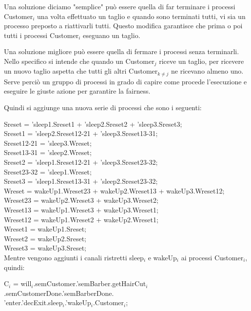 Una soluzione diciamo "semplice" può essere quella di far terminare i processi \textsf{Customer$_{i}$} una volta effettuato un taglio e quando sono terminati tutti, vi sia un processo preposto a riattivarli tutti. Questo modifica garantisce che prima o poi tutti i processi \textsf{Customer$_{i}$} eseguano un taglio.

Una soluzione migliore può essere quella di fermare i processi senza terminarli. Nello specifico si intende che quando un \textsf{Customer$_{j}$} riceve un taglio, per ricevere un nuovo taglio aspetta che tutti gli altri \textsf{Customer$_{k\not=j}$} ne ricevano almeno uno. Serve perciò un gruppo di processi in grado di capire come procede l'esecuzione e eseguire le giuste azione per garantire la fairness.

Quindi si aggiunge una nuova serie di processi che sono i seguenti:

\textsf{Sreset = 'sleep1.Sreset1 + 'sleep2.Sreset2 + 'sleep3.Sreset3;}\\
 \textsf{Sreset1 = 'sleep2.Sreset12-21 + 'sleep3.Sreset13-31;}\\
 \textsf{Sreset12-21 = 'sleep3.Wreset;} \\
 \textsf{Sreset13-31 = 'sleep2.Wreset; }\\
 \textsf{Sreset2 = 'sleep1.Sreset12-21 + 'sleep3.Sreset23-32;}\\
 \textsf{Sreset23-32 = 'sleep1.Wreset;} \\
 \textsf{Sreset3 = 'sleep1.Sreset13-31 + 'sleep2.Sreset23-32;}\\


 \textsf{Wreset = wakeUp1.Wreset23 + wakeUp2.Wreset13 + wakeUp3.Wreset12;}\\
 \textsf{Wreset23 = wakeUp2.Wreset3 + wakeUp3.Wreset2;}\\
 \textsf{Wreset13 = wakeUp1.Wreset3 + wakeUp3.Wreset1;}\\
 \textsf{Wreset12 = wakeUp1.Wreset2 + wakeUp2.Wreset1;}\\
 \textsf{Wreset1 =  wakeUp1.Sreset;}\\
 \textsf{Wreset2 =  wakeUp2.Sreset;}\\
 \textsf{Wreset3 =  wakeUp3.Sreset;}\\

Mentre vengono aggiunti i canali ristretti \textsf{sleep$_{i}$} e \textsf{wakeUp$_{i}$} ai processi \textsf{Customer$_{i}$}, quindi:

\textsf{C$_{i}$ = will$_{i}$.semCustomer.'semBarber.getHairCut$_{i}$.semCustomerDone.'semBarberDone.\\'enter.'decExit.sleep$_{i}$.'wakeUp$_{i}$.Customer$_{i}$;}

